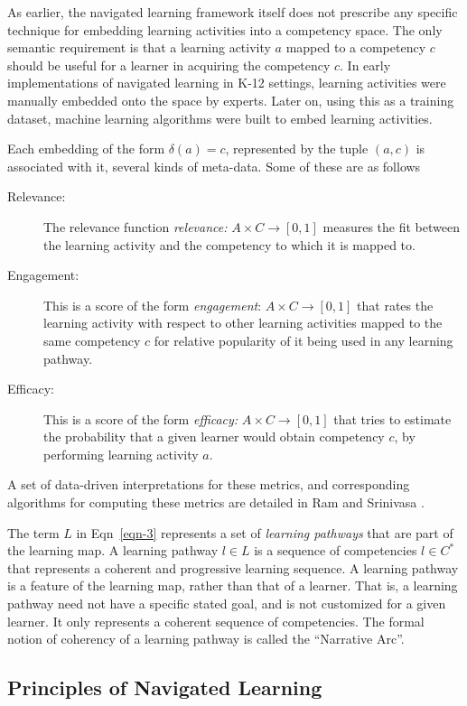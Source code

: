 \begin{multicols}{2}
As earlier, the navigated learning framework itself does not prescribe any specific technique for embedding learning activities into a competency space. The only semantic requirement is that a learning activity $a$ mapped to a competency $c$ should be useful for a learner in acquiring the competency $c$. In early implementations of navigated learning in K-12 settings, learning activities were manually embedded onto the space by experts. Later on, using this as a training dataset, machine learning algorithms were built to embed learning activities.

Each embedding of the form $\delta (a) = c$, represented by the tuple $(a, c)$ is associated with it, several kinds of meta-data. Some of these are as follows
\begin{description}
\item[Relevance:] The relevance function \textit{relevance:} $A \times C \rightarrow [0, 1]$ measures the fit between the learning activity and the competency to which it is mapped to.
\item[Engagement:] This is a score of the form  \textit{engagement}: $A \times C \rightarrow [0, 1]$ that rates the learning activity with respect to other learning activities mapped to the same competency $c$ for relative popularity of it being used in any learning pathway.
\item[Efficacy:] This is a score of the form \textit{efficacy:} $A \times C \rightarrow [0, 1]$ that tries to estimate the probability that a given learner would obtain competency $c$, by performing learning activity $a$.
\end{description}

A set of data-driven interpretations for these metrics, and corresponding algorithms for computing these metrics are detailed in Ram and Srinivasa \cite{art2-key40}.

The term $L$ in Eqn~\ref{eqn-3} represents a set of \textit{learning pathways} that are part of the learning map. A learning pathway $l \in L$ is a sequence of competencies $l \in C^\ast$ that represents a coherent and progressive learning sequence. A learning pathway is a feature of the learning map, rather than that of a learner. That is, a learning pathway need not have a specific stated goal, and is not customized for a given learner. It only represents a coherent sequence of competencies. The formal notion of coherency of a learning pathway is called the “Narrative Arc”.

\subsection{Principles of Navigated Learning}


\end{multicols}
